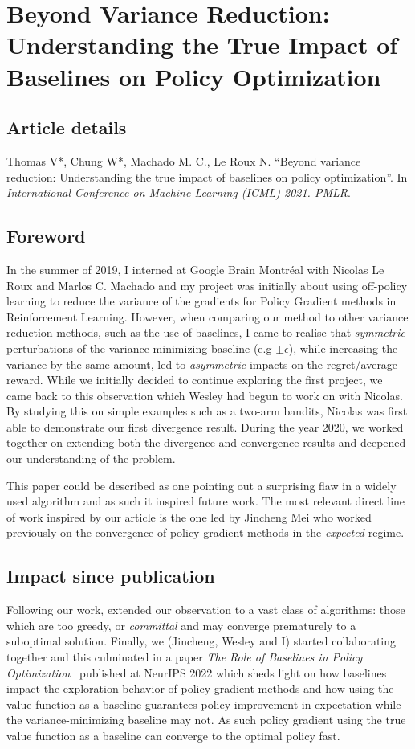 

\chapter{Beyond Variance Reduction: Understanding the True Impact of Baselines on Policy Optimization}
\label{chapter:baselines}
\section*{Article details}
Thomas V*, Chung W*, Machado M. C., Le Roux N. ``Beyond variance reduction: Understanding the true impact of baselines on policy optimization''. In \emph{International Conference on Machine Learning (ICML) 2021. PMLR}.

\section*{Foreword}
In the summer of 2019, I interned at Google Brain Montr\'{e}al with Nicolas Le Roux and Marlos C. Machado and my project was initially about using off-policy learning to reduce the variance of the gradients for Policy Gradient methods in Reinforcement Learning. However, when comparing our method to other variance reduction methods, such as the use of baselines, I came to realise that \emph{symmetric} perturbations of the variance-minimizing baseline (e.g $\pm \epsilon$), while increasing the variance by the same amount, led to \emph{asymmetric} impacts on the regret/average reward. While we initially decided to continue exploring the first project, we came back to this observation which Wesley had begun to work on with Nicolas. By studying this on simple examples such as a two-arm bandits, Nicolas was first able to demonstrate our first divergence result. During the year 2020, we worked together on extending both the divergence and convergence results and deepened our understanding of the problem.

This paper could be described as one pointing out a surprising flaw in a widely used algorithm and as such it inspired future work. The most relevant direct line of work inspired by our article is the one led by Jincheng Mei who worked previously on the convergence of policy gradient methods in the \emph{expected} regime. 

\section*{Impact since publication}
Following our work, \citet{mei2021understanding} extended our observation to a vast class of algorithms: those which are too greedy, or \emph{committal} and may converge prematurely to a suboptimal solution. Finally, we (Jincheng, Wesley and I) started collaborating together and this culminated in a paper \emph{The Role of Baselines in Policy Optimization}~\citep{mei2022role} published at NeurIPS 2022 which sheds light on how baselines impact the exploration behavior of policy gradient methods and how using the value function as a baseline guarantees policy improvement in expectation while the variance-minimizing baseline may not. As such policy gradient using the true value function as a baseline can converge to the optimal policy fast.


